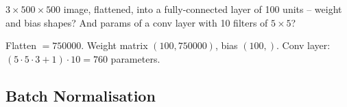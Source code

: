 \documentclass[10pt,a4paper]{article}
\newcommand{\q}[1]{\item #1}
\begin{document}
\begin{enumerate}[leftmargin=*,label=\textbf{Q\arabic*.}]
\q $3\times500\times500$ image, flattened, into a fully-connected layer of 100 units -- weight and bias shapes? And params of a conv layer with 10 filters of $5\times5$?
\begin{answerbox}
Flatten $=750000$. Weight matrix $(100, 750000)$, bias $(100,)$. Conv layer: $(5\cdot5\cdot3+1)\cdot10 = 760$ parameters.
\end{answerbox}

\end{enumerate}

\subsection{Batch Normalisation}
\end{document}
